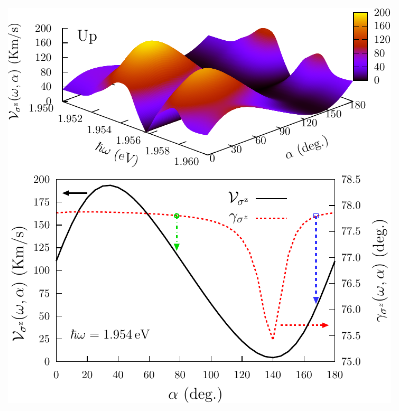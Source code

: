 \documentclass{beamer}
\begin{document}
\begin{frame}
\begin{columns}
\begin{center}
\begin{figure}[h!]
\begin{tikzpicture}
\end{tikzpicture}
\end{figure}


\end{center}


\begin{center}

\includegraphics[width=0.95\textwidth]{figs/fig5.pdf}

\end{center}  


\end{columns}

\end{frame}

\end{document}
